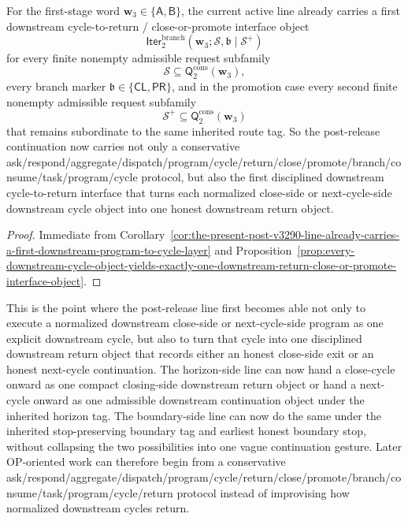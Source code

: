 \begin{corollary}
\label{cor:the-present-post-v3290-line-already-carries-a-first-downstream-cycle-to-return-interface}
For the first-stage word \(\mathbf w_3\in\{\mathsf A,\mathsf B\}\), the current active line already carries a first downstream cycle-to-return / close-or-promote interface object
\[
  \mathsf{Iter}^{\mathrm{branch}}_{2}(\mathbf w_3;\mathcal S,\mathfrak b\mid\mathcal S^{+})
\]
for every finite nonempty admissible request subfamily
\[
  \mathcal S\subseteq \mathsf{Q}^{\mathrm{cons}}_{2}(\mathbf w_3),
\]
every branch marker \(\mathfrak b\in\{\mathsf{CL},\mathsf{PR}\}\), and in the promotion case every second finite nonempty admissible request subfamily
\[
  \mathcal S^{+}\subseteq \mathsf{Q}^{\mathrm{cons}}_{2}(\mathbf w_3)
\]
that remains subordinate to the same inherited route tag. So the post-release continuation now carries not only a conservative ask/respond/aggregate/dispatch/program/cycle/return/close/promote/branch/consume/task/program/cycle protocol, but also the first disciplined downstream cycle-to-return interface that turns each normalized close-side or next-cycle-side downstream cycle object into one honest downstream return object.
\end{corollary}

\begin{proof}
Immediate from Corollary~\ref{cor:the-present-post-v3290-line-already-carries-a-first-downstream-program-to-cycle-layer} and Proposition~\ref{prop:every-downstream-cycle-object-yields-exactly-one-downstream-return-close-or-promote-interface-object}.
\end{proof}

\begin{remark}
\label{rem:what-the-first-downstream-cycle-to-return-interface-now-buys}
This is the point where the post-release line first becomes able not only to execute a normalized downstream close-side or next-cycle-side program as one explicit downstream cycle, but also to turn that cycle into one disciplined downstream return object that records either an honest close-side exit or an honest next-cycle continuation. The horizon-side line can now hand a close-cycle onward as one compact closing-side downstream return object or hand a next-cycle onward as one admissible downstream continuation object under the inherited horizon tag. The boundary-side line can now do the same under the inherited stop-preserving boundary tag and earliest honest boundary stop, without collapsing the two possibilities into one vague continuation gesture. Later OP-oriented work can therefore begin from a conservative ask/respond/aggregate/dispatch/program/cycle/return/close/promote/branch/consume/task/program/cycle/return protocol instead of improvising how normalized downstream cycles return.
\end{remark}


